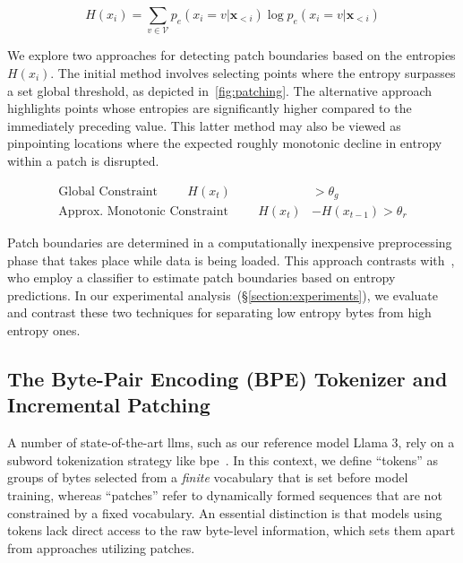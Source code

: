 \begin{equation}
H(x_i) = \sum_{v \in \mathcal{V}} p_{e}(x_i=v|\pmb{x}_{<i}) \log p_{e}(x_i=v|\pmb{x}_{<i})
\end{equation}

We explore two approaches for detecting patch boundaries based on the entropies $H(x_i)$. The initial method involves selecting points where the entropy surpasses a set global threshold, as depicted in~\autoref{fig:patching}. The alternative approach highlights points whose entropies are significantly higher compared to the immediately preceding value. This latter method may also be viewed as pinpointing locations where the expected roughly monotonic decline in entropy within a patch is disrupted.

\begin{align*}
    \text{Global Constraint}\hspace{1cm}H(x_t)& > \theta_g\\
    \text{Approx. Monotonic Constraint}\hspace{1cm}H(x_t)& - H(x_{t-1}) > \theta_r
\end{align*}

Patch boundaries are determined in a computationally inexpensive preprocessing phase that takes place while data is being loaded. This approach contrasts with~\citet{nawrot-etal-2023-efficient}, who employ a classifier to estimate patch boundaries based on entropy predictions. In our experimental analysis~(\S\ref{section:experiments}), we evaluate and contrast these two techniques for separating low entropy bytes from high entropy ones.

\subsection{The Byte-Pair Encoding (BPE) Tokenizer and Incremental Patching}
\label{section:incremental-patching}
\label{section:bpe-patch}

A number of state-of-the-art llms, such as our reference model Llama 3, rely on a subword tokenization strategy like bpe~\citep{gage1994new, sennrich-etal-2016-neural}. In this context, we define ``tokens'' as groups of bytes selected from a \textit{finite} vocabulary that is set before model training, whereas ``patches'' refer to dynamically formed sequences that are not constrained by a fixed vocabulary. An essential distinction is that models using tokens lack direct access to the raw byte-level information, which sets them apart from approaches utilizing patches.

